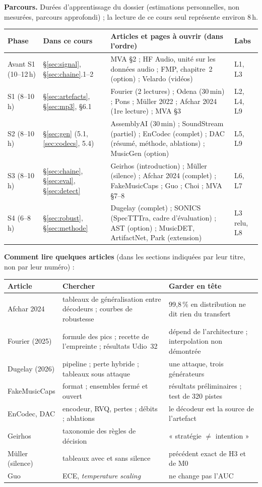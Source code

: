 \documentclass[10pt,a4paper]{article}
\begin{document}
\textbf{Parcours.} Durées d'apprentissage du dossier (estimations personnelles, non mesurées, parcours approfondi) ; la lecture de ce cours seul représente environ 8\,h.
\begin{center}
\begin{tabularx}{\textwidth}{@{}L{1.5cm}L{2.7cm}XL{1.5cm}@{}}
\toprule
\textbf{Phase} & \textbf{Dans ce cours} & \textbf{Articles et pages à ouvrir (dans l'ordre)} & \textbf{Labs}\\
\midrule
Avant S1 (10--12\,h) & §\ref{sec:signal}, §\ref{sec:chaine}.1--2 & MVA \S2 ; HF Audio, unité sur les données audio ; FMP, chapitre~2 (option) ; Velardo (vidéos) & L1, L3\\
S1 (8--10\,h) & §\ref{sec:artefacts}, §\ref{sec:mp3}, §6.1 & Fourier (2 lectures) ; Odena (30\,min) ; Pons ; Müller 2022 ; Afchar 2024 (1re lecture) ; MVA \S3 & L2, L4, L9\\
S2 (8--10\,h) & §\ref{sec:gen} (5.1, \ref{sec:codecs}, 5.4) & AssemblyAI (30\,min) ; SoundStream (partiel) ; EnCodec (complet) ; DAC (résumé, méthode, ablations) ; MusicGen (option) & L5, L9\\
S3 (8--10\,h) & §\ref{sec:chaine}, §\ref{sec:eval}, §\ref{sec:detect} & Geirhos (introduction) ; Müller (silence) ; Afchar 2024 (complet) ; FakeMusicCaps ; Guo ; Choi ; MVA \S7--8 & L6, L7\\
S4 (6--8\,h) & §\ref{sec:robust}, §\ref{sec:methode} & Dugelay (complet) ; SONICS (SpecTTTra, cadre d'évaluation) ; AST (option) ; MusicDET, ArtifactNet, Park (extension) & L3 relu, L8\\
\bottomrule
\end{tabularx}
\end{center}
\textbf{Comment lire quelques articles} (dans les sections indiquées par leur titre, non par leur numéro) :
\begin{center}
\begin{tabularx}{\textwidth}{@{}L{2.5cm}L{5.8cm}X@{}}
\toprule
\textbf{Article} & \textbf{Chercher} & \textbf{Garder en tête}\\
\midrule
Afchar 2024 & tableaux de généralisation entre décodeurs ; courbes de robustesse & 99,8\,\% en distribution ne dit rien du transfert\\
Fourier (2025) & formule des pics ; recette de l'empreinte ; résultats Udio~32 & dépend de l'architecture ; interpolation non démontrée\\
Dugelay (2026) & pipeline ; perte hybride ; tableaux sous attaque & une attaque, trois générateurs\\
FakeMusicCaps & format ; ensembles fermé et ouvert & résultats préliminaires ; test de 320 pistes\\
EnCodec, DAC & encodeur, RVQ, pertes ; débits ; ablations & le décodeur est la source de l'artefact\\
Geirhos & taxonomie des règles de décision & « stratégie $\neq$ intention »\\
Müller (silence) & tableaux avec et sans silence & précédent exact de H3 et de M0\\
Guo & ECE, \emph{temperature scaling} & ne change pas l'AUC\\
\bottomrule
\end{tabularx}
\end{center}
\end{document}
